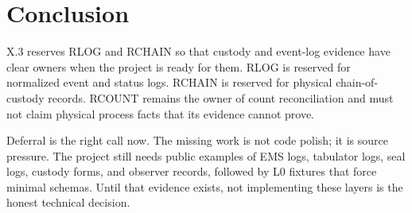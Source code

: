 \section{Conclusion}

X.3 reserves RLOG and RCHAIN so that custody and event-log evidence have clear
owners when the project is ready for them. RLOG is reserved for normalized event
and status logs. RCHAIN is reserved for physical chain-of-custody records.
RCOUNT remains the owner of count reconciliation and must not claim physical
process facts that its evidence cannot prove.

Deferral is the right call now. The missing work is not code polish; it is
source pressure. The project still needs public examples of EMS logs, tabulator
logs, seal logs, custody forms, and observer records, followed by L0 fixtures
that force minimal schemas. Until that evidence exists, not implementing these
layers is the honest technical decision.
